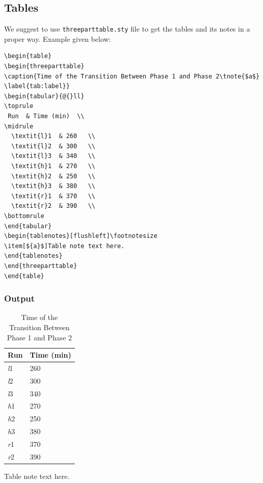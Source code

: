 \documentclass[]{Liebert_Author}
\begin{document}
\subsection{Tables}  

We suggest to use \verb!threeparttable.sty! file to get the tables
and its notes in a proper way. Example given below:

\begin{verbatim}
\begin{table}
\begin{threeparttable}
\caption{Time of the Transition Between Phase 1 and Phase 2\tnote{$a$}
\label{tab:label}}
\begin{tabular}{@{}ll}
\toprule
 Run  & Time (min)  \\
\midrule
  \textit{l}1  & 260   \\
  \textit{l}2  & 300   \\
  \textit{l}3  & 340   \\
  \textit{h}1  & 270   \\
  \textit{h}2  & 250   \\
  \textit{h}3  & 380   \\
  \textit{r}1  & 370   \\
  \textit{r}2  & 390   \\
\bottomrule
\end{tabular}
\begin{tablenotes}[flushleft]\footnotesize
\item[${a}$]Table note text here.
\end{tablenotes}
\end{threeparttable}
\end{table}
\end{verbatim}

\subsubsection*{Output}

\begin{table}[h!]
\begin{threeparttable}
\caption{Time of the Transition Between Phase 1 and Phase 2
\label{tab:label}}
\setlength{\tabcolsep}{45pt}%
\begin{tabular}{@{}ll}
\toprule
 Run  & Time (min)  \\
\midrule
  \textit{l}1  & 260   \\
  \textit{l}2  & 300   \\
  \textit{l}3  & 340   \\
  \textit{h}1  & 270   \\
  \textit{h}2  & 250   \\
  \textit{h}3  & 380   \\
  \textit{r}1  & 370   \\
  \textit{r}2  & 390   \\
\bottomrule
\end{tabular}
\begin{tablenotes}[flushleft]\footnotesize
\item[${a}$]Table note text here.
\end{tablenotes}
\end{threeparttable}
\end{table}
\end{document}
